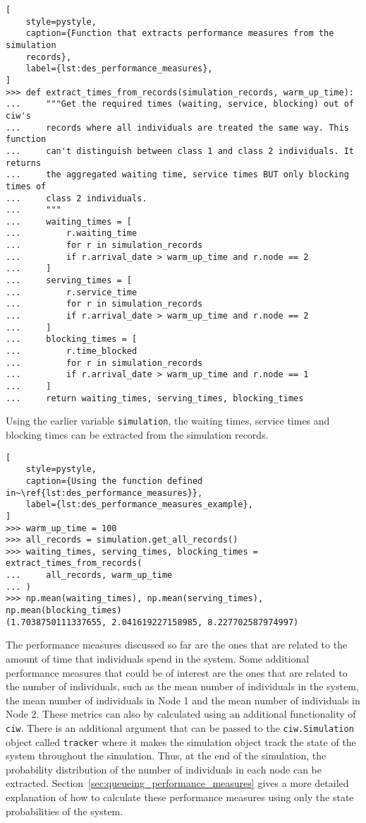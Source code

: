 \begin{lstlisting}[
    style=pystyle,
    caption={Function that extracts performance measures from the simulation
    records},
    label={lst:des_performance_measures},
]
>>> def extract_times_from_records(simulation_records, warm_up_time):
...     """Get the required times (waiting, service, blocking) out of ciw's
...     records where all individuals are treated the same way. This function
...     can't distinguish between class 1 and class 2 individuals. It returns
...     the aggregated waiting time, service times BUT only blocking times of
...     class 2 individuals.
...     """
...     waiting_times = [
...         r.waiting_time
...         for r in simulation_records
...         if r.arrival_date > warm_up_time and r.node == 2
...     ]
...     serving_times = [
...         r.service_time
...         for r in simulation_records
...         if r.arrival_date > warm_up_time and r.node == 2
...     ]
...     blocking_times = [
...         r.time_blocked
...         for r in simulation_records
...         if r.arrival_date > warm_up_time and r.node == 1
...     ]
...     return waiting_times, serving_times, blocking_times

\end{lstlisting}

Using the earlier variable \texttt{simulation}, the waiting
times, service times and blocking times can be extracted from the simulation
records.

\begin{lstlisting}[
    style=pystyle,
    caption={Using the function defined in~\ref{lst:des_performance_measures}},
    label={lst:des_performance_measures_example},
]
>>> warm_up_time = 100
>>> all_records = simulation.get_all_records()
>>> waiting_times, serving_times, blocking_times = extract_times_from_records(
...     all_records, warm_up_time
... )
>>> np.mean(waiting_times), np.mean(serving_times), np.mean(blocking_times)
(1.7038750111337655, 2.041619227158985, 8.227702587974997)

\end{lstlisting}

The performance measures discussed so far are the ones that are related to the
amount of time that individuals spend in the system.
Some additional performance measures that could be of interest are the
ones that are related to the number of individuals, such as the mean number of
individuals in the system, the mean number of individuals in Node 1 and the
mean number of individuals in Node 2.
These metrics can also by calculated using an additional functionality of
\texttt{ciw}.
There is an additional argument that can be passed to the
\texttt{ciw.Simulation} object called \texttt{tracker} where it makes the
simulation object track the state of the system throughout the simulation.
Thus, at the end of the simulation, the probability distribution of the number
of individuals in each node can be extracted.
Section~\ref{sec:queueing_performance_measures} gives a more detailed
explanation of how to calculate these performance measures using only the
state probabilities of the system.
